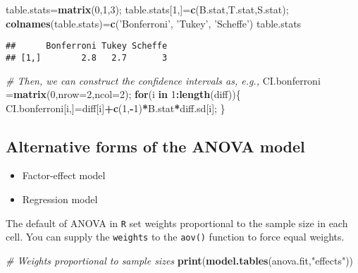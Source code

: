 \documentclass[12pt,]{book}
\newenvironment{Shaded}{\begin{snugshade}}{\end{snugshade}}
\newcommand{\KeywordTok}[1]{\textcolor[rgb]{0.13,0.29,0.53}{\textbf{#1}}}
\newcommand{\DataTypeTok}[1]{\textcolor[rgb]{0.13,0.29,0.53}{#1}}
\newcommand{\DecValTok}[1]{\textcolor[rgb]{0.00,0.00,0.81}{#1}}
\newcommand{\StringTok}[1]{\textcolor[rgb]{0.31,0.60,0.02}{#1}}
\newcommand{\CommentTok}[1]{\textcolor[rgb]{0.56,0.35,0.01}{\textit{#1}}}
\newcommand{\ControlFlowTok}[1]{\textcolor[rgb]{0.13,0.29,0.53}{\textbf{#1}}}
\newcommand{\OperatorTok}[1]{\textcolor[rgb]{0.81,0.36,0.00}{\textbf{#1}}}
\newcommand{\NormalTok}[1]{#1}
\providecommand{\tightlist}{%
  \setlength{\itemsep}{0pt}\setlength{\parskip}{0pt}}
\begin{document}
\begin{Shaded}
\begin{Highlighting}[]
\NormalTok{table.stats=}\KeywordTok{matrix}\NormalTok{(}\DecValTok{0}\NormalTok{,}\DecValTok{1}\NormalTok{,}\DecValTok{3}\NormalTok{);}
\NormalTok{table.stats[}\DecValTok{1}\NormalTok{,]=}\KeywordTok{c}\NormalTok{(B.stat,T.stat,S.stat);}
\KeywordTok{colnames}\NormalTok{(table.stats)=}\KeywordTok{c}\NormalTok{(}\StringTok{'Bonferroni'}\NormalTok{, }\StringTok{'Tukey'}\NormalTok{, }\StringTok{'Scheffe'}\NormalTok{)}
\NormalTok{table.stats}
\end{Highlighting}
\end{Shaded}

\begin{verbatim}
##      Bonferroni Tukey Scheffe
## [1,]        2.8   2.7       3
\end{verbatim}

\begin{Shaded}
\begin{Highlighting}[]
\CommentTok{# Then, we can construct the confidence intervals as, e.g.,}
\NormalTok{CI.bonferroni =}\KeywordTok{matrix}\NormalTok{(}\DecValTok{0}\NormalTok{,}\DataTypeTok{nrow=}\DecValTok{2}\NormalTok{,}\DataTypeTok{ncol=}\DecValTok{2}\NormalTok{);}
\ControlFlowTok{for}\NormalTok{(i }\ControlFlowTok{in} \DecValTok{1}\OperatorTok{:}\KeywordTok{length}\NormalTok{(diff))\{}
\NormalTok{  CI.bonferroni[i,]=diff[i]}\OperatorTok{+}\KeywordTok{c}\NormalTok{(}\DecValTok{1}\NormalTok{,}\OperatorTok{-}\DecValTok{1}\NormalTok{)}\OperatorTok{*}\NormalTok{B.stat}\OperatorTok{*}\NormalTok{diff.sd[i];}
\NormalTok{\}}
\end{Highlighting}
\end{Shaded}

\subsection{Alternative forms of the ANOVA
model}\label{alternative-forms-of-the-anova-model}

\begin{itemize}
\tightlist
\item
  Factor-effect model
\item
  Regression model
\end{itemize}

The default of ANOVA in \texttt{R} set weights proportional to the
sample size in each cell. You can supply the \texttt{weights} to the
\texttt{aov()} function to force equal weights.

\begin{Shaded}
\begin{Highlighting}[]
\CommentTok{# Weights proportional to sample sizes }
\KeywordTok{print}\NormalTok{(}\KeywordTok{model.tables}\NormalTok{(anova.fit,}\StringTok{"effects"}\NormalTok{))}
\end{Highlighting}
\end{Shaded}
\end{document}
